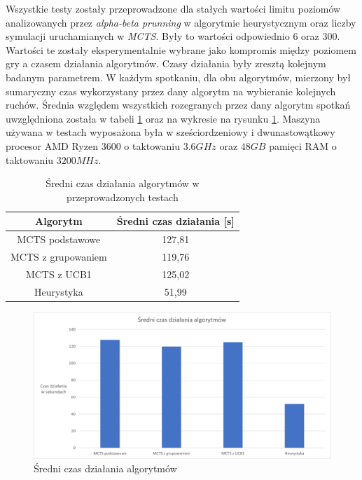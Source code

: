 \documentclass[10pt]{article}
\begin{document}
Wszystkie testy zostały przeprowadzone dla stałych wartości limitu poziomów analizowanych przez \textit{alpha-beta prunning} w algorytmie heurystycznym oraz liczby symulacji uruchamianych w \textit{MCTS}. Były to wartości odpowiednio $6$ oraz $300$. Wartości te zostały eksperymentalnie wybrane jako kompromis między poziomem gry a czasem działania algorytmów. Czasy działania były zresztą kolejnym badanym parametrem. W każdym spotkaniu, dla obu algorytmów, mierzony był sumaryczny czas wykorzystany przez dany algorytm na wybieranie kolejnych ruchów. Średnia względem wszystkich rozegranych przez dany algorytm spotkań uwzględniona została w tabeli \ref{tab:test1b} oraz na wykresie na rysunku \ref{fig:test1b}. Maszyna używana w testach wyposażona była w sześciordzeniowy i dwunastowątkowy procesor AMD Ryzen 3600 o taktowaniu $3.6 GHz$ oraz $48GB$ pamięci RAM o taktowaniu $3200 MHz$.

\begin{table}[H]
\centering
\begin{tabularx}{0.45\textwidth}{c|c}
\hline
Algorytm & Średni czas działania [s] \\
\hline \hline
MCTS podstawowe & 127,81 \\
MCTS z grupowaniem & 119,76 \\
MCTS z UCB1 & 125,02 \\
Heurystyka & 51,99 \\
\hline
\end{tabularx}
\caption{Średni czas działania algorytmów w przeprowadzonych testach}
\label{tab:test1b}
\end{table}

\begin{figure}[H]
\centering
\includegraphics[width=\textwidth]{images/test1b.png}
\caption{Średni czas działania algorytmów}
\label{fig:test1b}
\end{figure}
\end{document}
